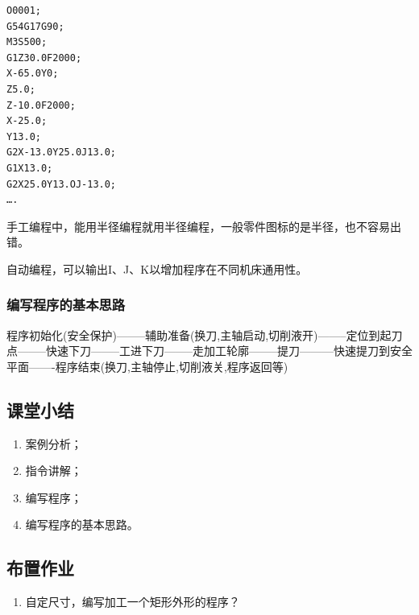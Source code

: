 \begin{lstlisting}
O0001;
G54G17G90;
M3S500;
G1Z30.0F2000;
X-65.0Y0;
Z5.0;
Z-10.0F2000;
X-25.0;
Y13.0;
G2X-13.0Y25.0J13.0;
G1X13.0;
G2X25.0Y13.OJ-13.0;
….
\end{lstlisting}






手工编程中，能用半径编程就用半径编程，一般零件图标的是半径，也不容易出错。

自动编程，可以输出I、J、K以增加程序在不同机床通用性。


\subsubsection{编写程序的基本思路}
程序初始化(安全保护)--------辅助准备(换刀,主轴启动,切削液开)--------定位到起刀点--------快速下刀--------工进下刀--------走加工轮廓--------提刀---------快速提刀到安全平面-------程序结束(换刀,主轴停止,切削液关,程序返回等)
\subsection{课堂小结}
\begin{enumerate}[1、]
\item 案例分析；
\item 指令讲解；
\item 编写程序；
\item 编写程序的基本思路。
\end{enumerate}
\vfill
\subsection{布置作业}
\begin{enumerate}[1、]
	\item 自定尺寸，编写加工一个矩形外形的程序？
\end{enumerate}
\vfill